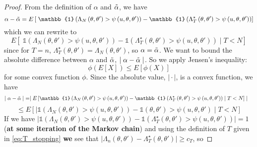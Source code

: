 \documentclass{article}
\theoremstyle{definition}
\begin{document}
\begin{proof} From the definition of $\alpha$ and $\Tilde{\alpha}$, we have 
\begin{equation*}
\alpha - \Tilde{\alpha} = E\left[\; \mathbb{1}\left(\Lambda_N\left(\theta, \theta'\right) > \psi\left(u, \theta, \theta'\right)\right) - \mathbb{1}\left(\Lambda_T^{\star}\left(\theta, \theta'\right) > \psi\left(u, \theta, \theta'\right)\right)\right]    
\end{equation*}
which we can rewrite to
\begin{equation*}
    E\left[\; \mathbb{1}\left(\Lambda_N\left(\theta, \theta'\right) > \psi\left(u, \theta, \theta'\right)\right) - \mathbb{1}\left(\Lambda_T^{\star}\left(\theta,\theta'\right) > \psi\left(u, \theta, \theta'\right)\right)\mid T < N \right] 
\end{equation*}
since for $T = n$, $\Lambda_T^{\star}\left(\theta, \theta'\right) = \Lambda_N\left(\theta, \theta'\right)$, so  $\alpha = \Tilde{\alpha}$. We want to bound the absolute difference between $\alpha$ and $\Tilde{\alpha}$, $\mid \alpha - \Tilde{\alpha}\mid$. So we apply Jensen's inequality: 
\begin{equation}\label{eq:jensen}
\phi\left(E\left[X\right] \right) \leq E\left[\phi\left(X\right)\right] 
\end{equation}
for some convex function $\phi$. Since the absolute value, $\mid \cdot\mid$, is a convex function, we have  
\begin{equation*}
\begin{split}
\mid \alpha - \Tilde{\alpha}\mid &= 
    \mid E\left[\mathbb{1}\left(\Lambda_N\left(\theta, \theta'\right) > \psi \left(u, \theta, \theta'\right)\right) - \mathbb{1}\left(\Lambda_T^{\star}\left(\theta, \theta'\right) > \psi\left(u, \theta, \theta'\right)\right)\mid T < N\right]\mid 
    \end{split}
\end{equation*}
\begin{equation*}
    \leq E\left[\mid \mathbb{1}\left(\Lambda_N\left(\theta, \theta'\right) > \psi\left(u, \theta, \theta'\right)\right) - \mathbb{1}\left(\theta, \theta'\right) > \psi\left(u, \theta, \theta'\right)\mid T<  N\right]
\end{equation*}
If we have $\mid \mathbb{1}\left(\Lambda_N\left(\theta, \theta'\right) > \psi\left(u, \theta, \theta'\right)\right) - \mathbb{1}\left(\Lambda_T^{\star}\left(\theta, \theta'\right) > \psi\left(u, \theta, \theta'\right)\right)\mid = 1$ (\textbf{at some iteration of the Markov chain}) and using the definition of $T$ given in \eqref{eq:T_stopping} \textbf{we} see that $\mid \Lambda_n\left(\theta, \theta'\right) - \Lambda_T^{\star}\left(\theta, \theta'\right) \mid \geq c_T$, so

\end{proof}
\end{document}
